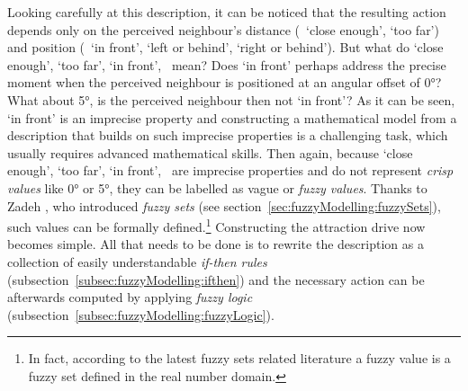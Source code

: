 Looking carefully at this description, it can be noticed that the resulting action depends only on the perceived neighbour's distance (\ie\ `close enough', `too far') and position (\ie\ `in front', `left or behind', `right or behind'). But what do `close enough', `too far', `in front', \etc\ mean? Does `in front' perhaps address the precise moment when the perceived neighbour is positioned at an angular offset of \ang{0}? What about \ang{5}, is the perceived neighbour then not `in front'? As it can be seen, `in front' is an imprecise property and constructing a mathematical model from a description that builds on such imprecise properties is a challenging task, which usually requires advanced mathematical skills. Then again, because `close enough', `too far', `in front', \etc\ are imprecise properties and do not represent \emph{crisp values} like \ang{0} or \ang{5}, they can be labelled as vague or \emph{fuzzy values}. Thanks to Zadeh \cite{zadeh:1965}, who introduced \emph{fuzzy sets} (see section~\ref{sec:fuzzyModelling:fuzzySets}), such values can be formally defined.\footnote{In fact, according to the latest fuzzy sets related literature \cite{lee:2004} a fuzzy value is a fuzzy set defined in the real number domain.} Constructing the attraction drive now becomes simple. All that needs to be done is to rewrite the description as a collection of easily understandable \emph{if-then rules} (subsection~\ref{subsec:fuzzyModelling:ifthen}) and the necessary action can be afterwards computed by applying \emph{fuzzy logic} (subsection~\ref{subsec:fuzzyModelling:fuzzyLogic}).


